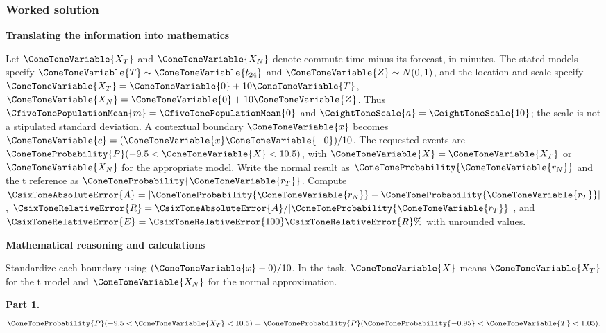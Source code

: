 \subsubsection*{Worked solution}\label{sol:c9-d5}
\par\textbf{Translating the information into mathematics}\par
Let $\ConeToneVariable{X_T}$ and $\ConeToneVariable{X_N}$ denote commute time minus its forecast, in minutes. The stated models specify $\ConeToneVariable{T}\sim \ConeToneVariable{t_{24}}$ and $\ConeToneVariable{Z}\sim N(0,1)$, and the location and scale specify $\ConeToneVariable{X_T}=\ConeToneVariable{0}+10\ConeToneVariable{T}$, $\ConeToneVariable{X_N}=\ConeToneVariable{0}+10\ConeToneVariable{Z}$. Thus $\CfiveTonePopulationMean{m}=\CfiveTonePopulationMean{0}$ and $\CeightToneScale{a}=\CeightToneScale{10}$; the scale is not a stipulated standard deviation. A contextual boundary $\ConeToneVariable{x}$ becomes $\ConeToneVariable{c}=(\ConeToneVariable{x}\ConeToneVariable{-0})/10$. The requested events are $\ConeToneProbability{P}(-9.5<\ConeToneVariable{X}<10.5)$, with $\ConeToneVariable{X}=\ConeToneVariable{X_T}$ or $\ConeToneVariable{X_N}$ for the appropriate model. Write the normal result as $\ConeToneProbability{\ConeToneVariable{r_N}}$ and the t reference as $\ConeToneProbability{\ConeToneVariable{r_T}}$. Compute $\CsixToneAbsoluteError{A}=|\ConeToneProbability{\ConeToneVariable{r_N}}-\ConeToneProbability{\ConeToneVariable{r_T}}|$, $\CsixToneRelativeError{R}=\CsixToneAbsoluteError{A}/|\ConeToneProbability{\ConeToneVariable{r_T}}|$, and $\CsixToneRelativeError{E}=\CsixToneRelativeError{100}\CsixToneRelativeError{R}\%$ with unrounded values.
\par\textbf{Mathematical reasoning and calculations}\par
Standardize each boundary using $(\ConeToneVariable{x}-0)/10$. In the task, $\ConeToneVariable{X}$ means $\ConeToneVariable{X_T}$ for the t model and $\ConeToneVariable{X_N}$ for the normal approximation.
\par\textbf{Part 1.}\[\ConeToneProbability{P}(-9.5<\ConeToneVariable{X_T}<10.5)=\ConeToneProbability{P}(\ConeToneProbability{-0.95}<\ConeToneVariable{T}<1.05).\]
